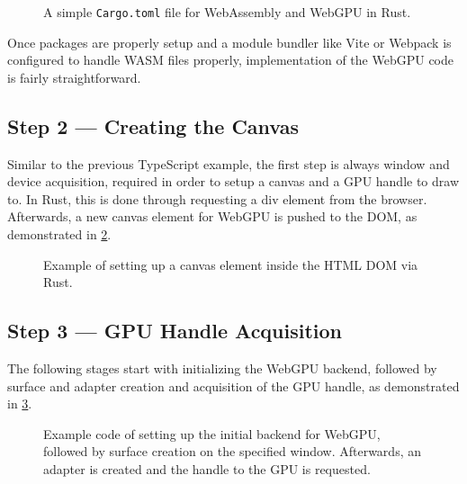 \begin{figure}[tp]
  \centering

  \caption[Code Snippet: Cargo.toml]
  {
    A simple \lstinline{Cargo.toml} file for WebAssembly and WebGPU in Rust.
  }
  \label{code:cargo}
\end{figure}


Once packages are properly setup and a module bundler like Vite or Webpack is configured to handle WASM files properly,
implementation of the WebGPU code is fairly straightforward.



\subsection{Step 2 --- Creating the Canvas}
Similar to the previous TypeScript example, the first step is always window and device acquisition, required in order
to setup a canvas and a GPU handle to draw to. In Rust, this is done through requesting a div element from the browser.
Afterwards, a new canvas element for WebGPU is pushed to the DOM, as demonstrated in \ref{code:rust-canvas}.

\begin{figure}[tp]
  \centering

  \caption[Code Snippet: Canvas Setup]
  {
    Example of setting up a canvas element inside the HTML DOM via Rust.
  }
  \label{code:rust-canvas}
\end{figure}



\subsection{Step 3 --- GPU Handle Acquisition}
The following stages start with initializing the WebGPU backend, followed by surface and adapter creation and acquisition
of the GPU handle, as demonstrated in \ref{code:rust-handle}.

\begin{figure}[tp]
  \centering

  \caption[Code Snippet: Backend, surface, adapter, and GPU handle setup]
  {
    Example code of setting up the initial backend for WebGPU, followed by surface creation on the
    specified window. Afterwards, an adapter is created and the handle to the GPU is requested.
  }
  \label{code:rust-handle}
\end{figure}



